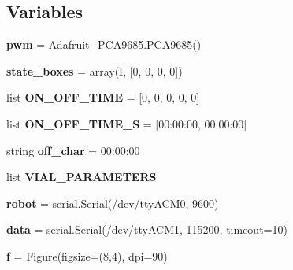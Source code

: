 \subsection*{Variables}
\begin{DoxyCompactItemize}
\item 
\mbox{\label{namespacebackend_a66c011e3cef118db76db324acedd3e26}} 
{\bfseries pwm} = Adafruit\+\_\+\+P\+C\+A9685.\+P\+C\+A9685()
\item 
\mbox{\label{namespacebackend_ad83a23fdf1780f40ed9880fc5b65e3d8}} 
{\bfseries state\+\_\+boxes} = array(\textquotesingle{}I\textquotesingle{}, \mbox{[}0, 0, 0, 0\mbox{]})
\item 
\mbox{\label{namespacebackend_a85622f023f71ccd53933fb16ff593384}} 
list {\bfseries O\+N\+\_\+\+O\+F\+F\+\_\+\+T\+I\+ME} = \mbox{[}0, 0, 0, 0, 0\mbox{]}
\item 
\mbox{\label{namespacebackend_ae88a511e93c32e70e51bb64c184bdc8b}} 
list {\bfseries O\+N\+\_\+\+O\+F\+F\+\_\+\+T\+I\+M\+E\+\_\+S} = \mbox{[}\textquotesingle{}00\+:00\+:00\textquotesingle{}, \textquotesingle{}00\+:00\+:00\textquotesingle{}\mbox{]}
\item 
\mbox{\label{namespacebackend_aba6c4b8918ec6d52f6da7889f25d6f85}} 
string {\bfseries off\+\_\+char} = \textquotesingle{}00\+:00\+:00\textquotesingle{}
\item 
list {\bfseries V\+I\+A\+L\+\_\+\+P\+A\+R\+A\+M\+E\+T\+E\+RS}
\item 
\mbox{\label{namespacebackend_a629fc1a8b3be02b6fe948842e2a43665}} 
{\bfseries robot} = serial.\+Serial(\textquotesingle{}/dev/tty\+A\+C\+M0\textquotesingle{}, 9600)
\item 
\mbox{\label{namespacebackend_ac3d83374d7942e08c5ba3a0262af64aa}} 
{\bfseries data} = serial.\+Serial(\textquotesingle{}/dev/tty\+A\+C\+M1\textquotesingle{}, 115200, timeout=10)
\item 
\mbox{\label{namespacebackend_afab395ab9b22ce9616dbfd085f7bfc50}} 
{\bfseries f} = Figure(figsize=(8,4), dpi=90)
\item 

\end{DoxyCompactItemize}
